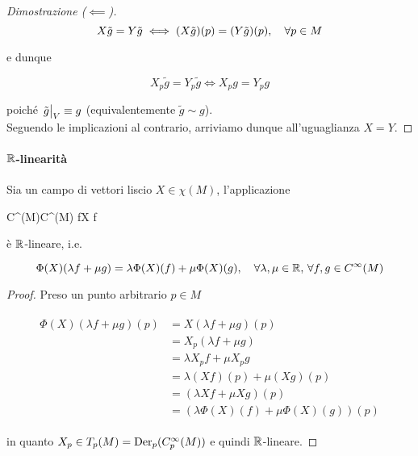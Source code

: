 \begin{proof}[Dimostrazione ($ \impliedby $)]
	\begin{equation}
		X \tilde{g} = Y \tilde{g} \iff (X \tilde{g})(p) = (Y \tilde{g})(p) \qcomma \forall p \in M
	\end{equation}

	e dunque
	
	\begin{equation}
		X_{p} \tilde{g} = Y_{p} \tilde{g} \iff X_{p} g = Y_{p} g
	\end{equation}

	poiché $ \eval{\tilde{g}}_{V} \equiv g $ (equivalentemente $ \tilde{g} \sim g $).\\
	Seguendo le implicazioni al contrario, arriviamo dunque all'uguaglianza $ X = Y $.
\end{proof}

\paragraph{$ \mathbb{R} $-linearità}

\begin{definition}
	Sia un campo di vettori liscio $ X \in \chi(M) $, l'applicazione
	
		{C^{\infty}(M)}{C^{\infty}(M)}
		{f}{X f}
	
	è $ \mathbb{R} $-lineare, i.e.
	
	\begin{equation}
		\Phi(X)(\lambda f + \mu g) = \lambda \Phi(X)(f) + \mu \Phi(X)(g) \qcomma \forall \lambda,\mu \in \R, \, \forall f,g \in C^{\infty}(M)
	\end{equation}
\end{definition}

\begin{proof}
	Preso un punto arbitrario $ p \in M $
	
	\begin{align}
		\begin{split}
			\Phi(X)(\lambda f + \mu g)(p) &= X(\lambda f + \mu g)(p)\\
			&= X_{p}(\lambda f + \mu g)\\
			&= \lambda X_{p} f + \mu X_{p} g\\
			&= \lambda (X f)(p) + \mu (X g)(p)\\
			&= (\lambda X f + \mu X g)(p)\\
			&= (\lambda \Phi(X)(f) + \mu \Phi(X)(g))(p)
		\end{split}
	\end{align}

	in quanto $ X_{p} \in T_{p}(M) = \operatorname{Der}_{p}(C_{p}^{\infty}(M)) $ e quindi $ \mathbb{R} $-lineare.
\end{proof}

